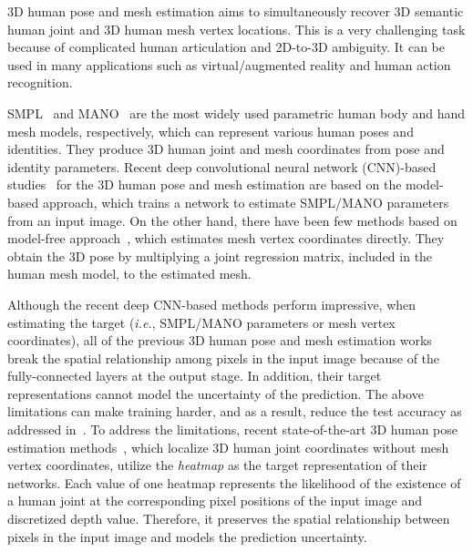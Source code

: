 \documentclass[runningheads]{llncs}
\begin{document}
3D human pose and mesh estimation aims to simultaneously recover 3D semantic human joint and 3D human mesh vertex locations. 
This is a very challenging task because of complicated human articulation and 2D-to-3D ambiguity.
It can be used in many applications such as virtual/augmented reality and human action recognition.

SMPL~\cite{loper2015smpl} and MANO~\cite{romero2017embodied} are the most widely used parametric human body and hand mesh models, respectively, which can represent various human poses and identities.
They produce 3D human joint and mesh coordinates from pose and identity parameters.
Recent deep convolutional neural network (CNN)-based studies~\cite{kanazawa2018end,pavlakos2018learning,kolotouros2019learning} for the 3D human pose and mesh estimation are based on the model-based approach, which trains a network to estimate SMPL/MANO parameters from an input image. 
On the other hand, there have been few methods based on model-free approach~\cite{ge20193d,kolotouros2019convolutional}, which estimates mesh vertex coordinates directly.
They obtain the 3D pose by multiplying a joint regression matrix, included in the human mesh model, to the estimated mesh.

Although the recent deep CNN-based methods perform impressive, when estimating the target (\textit{i.e.}, SMPL/MANO parameters or mesh vertex coordinates), all of the previous 3D human pose and mesh estimation works break the spatial relationship among pixels in the input image because of the fully-connected layers at the output stage.
In addition, their target representations cannot model the uncertainty of the prediction.
The above limitations can make training harder, and as a result, reduce the test accuracy as addressed in~\cite{moon2018v2v,tompson2014joint}.
To address the limitations, recent state-of-the-art 3D human pose estimation methods~\cite{moon2018v2v,moon2019camera,sun2018integral}, which localize 3D human joint coordinates without mesh vertex coordinates, utilize the \emph{heatmap} as the target representation of their networks.
Each value of one heatmap represents the likelihood of the existence of a human joint at the corresponding pixel positions of the input image and discretized depth value.
Therefore, it preserves the spatial relationship between pixels in the input image and models the prediction uncertainty.
\end{document}
